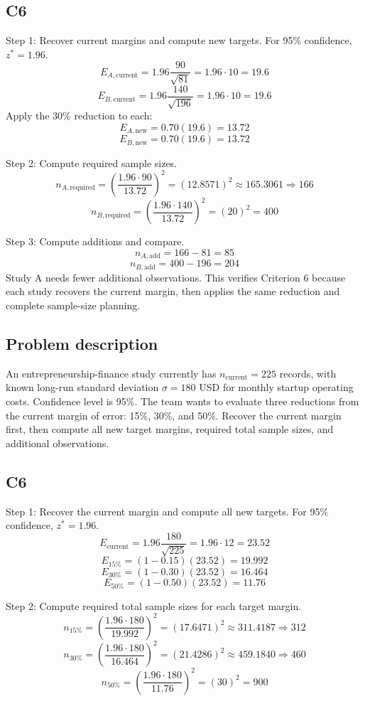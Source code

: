 \begin{ExamProblems}
		\subsection*{C6}
		Step 1: Recover current margins and compute new targets. For 95\% confidence, $z^* = 1.96$.
		\[
		E_{A,\text{current}} = 1.96\frac{90}{\sqrt{81}} = 1.96\cdot 10 = 19.6
		\]
		\[
		E_{B,\text{current}} = 1.96\frac{140}{\sqrt{196}} = 1.96\cdot 10 = 19.6
		\]
		Apply the 30\% reduction to each:
		\[
		E_{A,\text{new}} = 0.70(19.6) = 13.72
		\]
		\[
		E_{B,\text{new}} = 0.70(19.6) = 13.72
		\]

		Step 2: Compute required sample sizes.
		\[
		n_{A,\text{required}} = \left(\frac{1.96\cdot 90}{13.72}\right)^2
		= \left(12.8571\right)^2
		\approx 165.3061 \Rightarrow 166
		\]
		\[
		n_{B,\text{required}} = \left(\frac{1.96\cdot 140}{13.72}\right)^2
		= \left(20\right)^2
		= 400
		\]

		Step 3: Compute additions and compare.
		\[
		n_{A,\text{add}} = 166 - 81 = 85
		\]
		\[
		n_{B,\text{add}} = 400 - 196 = 204
		\]
		Study A needs fewer additional observations. This verifies Criterion 6 because each study recovers the current margin, then applies the same reduction and complete sample-size planning.

		\item
		\subsection*{Problem description}
		An entrepreneurship-finance study currently has $n_{\text{current}} = 225$ records, with known long-run standard deviation $\sigma = 180$ USD for monthly startup operating costs. Confidence level is 95\%. The team wants to evaluate three reductions from the current margin of error: 15\%, 30\%, and 50\%. Recover the current margin first, then compute all new target margins, required total sample sizes, and additional observations.

		\subsection*{C6}
		Step 1: Recover the current margin and compute all new targets. For 95\% confidence, $z^* = 1.96$.
		\[
		E_{\text{current}} = 1.96\frac{180}{\sqrt{225}} = 1.96\cdot 12 = 23.52
		\]
		\[
		E_{15\%} = (1-0.15)(23.52) = 19.992
		\]
		\[
		E_{30\%} = (1-0.30)(23.52) = 16.464
		\]
		\[
		E_{50\%} = (1-0.50)(23.52) = 11.76
		\]

		Step 2: Compute required total sample sizes for each target margin.
		\[
		n_{15\%} = \left(\frac{1.96\cdot 180}{19.992}\right)^2
		= \left(17.6471\right)^2
		\approx 311.4187 \Rightarrow 312
		\]
		\[
		n_{30\%} = \left(\frac{1.96\cdot 180}{16.464}\right)^2
		= \left(21.4286\right)^2
		\approx 459.1840 \Rightarrow 460
		\]
		\[
		n_{50\%} = \left(\frac{1.96\cdot 180}{11.76}\right)^2
		= \left(30\right)^2
		= 900
		\]


\end{ExamProblems}
